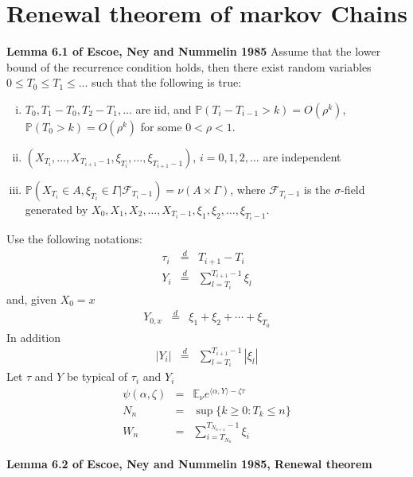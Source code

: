 \documentclass[12pt]{article}
\newcommand{\E}{
        \mathbb{E}
}
\newcommand{\p}{
        \mathbb{P}
}
\newcommand{\inn}[1]{
  \langle#1\rangle
}
\begin{document}
\section{Renewal theorem of markov Chains}
{\bf Lemma 6.1 of Escoe, Ney and Nummelin 1985}
Assume that the lower bound of the recurrence condition holds, then
there exist random variables $0 \leq T_0 \leq T_1 \leq \dots$ such
that the following is true:
\begin{enumerate}[(i)]
\item $T_0, T_1 - T_0, T_2 - T_1, \dots$ are iid, and $\p(T_i -
  T_{i-1} > k) = O(\rho^k)$, $\p(T_0 > k) = O(\rho^k)$ for some $0 <
  \rho < 1$.
\item $(X_{T_i}, \dots, X_{T_{i+1} - 1}, \xi_{T_i}, \dots,
  \xi_{T_{i+1} - 1})$, $i=0, 1, 2, \dots$ are independent
\item $\p(X_{T_i} \in A, \xi_{T_i} \in \Gamma | \mathscr F_{T_i-1}) =
  \nu(A \times \Gamma)$, where $\mathscr F_{T_i-1}$ is the
  $\sigma$-field generated by $X_0, X_1, X_2, \dots, X_{T_i-1}, \xi_1,
  \xi_2, \dots, \xi_{T_i-1}$.
\end{enumerate}
Use the following notations:
\begin{eqnarray*}
  \tau_i &\overset{d}{=}& T_{i+1} - T_i \\
  Y_i &\overset{d}{=}& \sum_{l=T_i}^{T_{i+1}-1} \xi_l
\end{eqnarray*}
and, given $X_0 = x$
\begin{eqnarray*}
  Y_{0, x} &\overset{d}{=}& \xi_1 + \xi_2 + \cdots + \xi_{T_0}
\end{eqnarray*}
In addition
\begin{eqnarray*}
  |Y_i| &\overset{d}{=}& \sum_{l=T_i}^{T_{i+1}-1} |\xi_l|
\end{eqnarray*}
Let $\tau$ and $Y$ be typical of $\tau_i$ and $Y_i$
\begin{eqnarray*}
  \psi(\alpha, \zeta) &=& \E_{\nu} e^{\inn{\alpha, Y} - \zeta \tau} \\  
  N_n &=& \sup\{k \geq 0: T_k \leq n\} \\
  W_n &=& \sum_{i=T_{N_n}}^{T_{N_{n+1}} - 1} \xi_i
\end{eqnarray*}

{\bf Lemma 6.2 of Escoe, Ney and Nummelin 1985, Renewal theorem}


\end{document}
